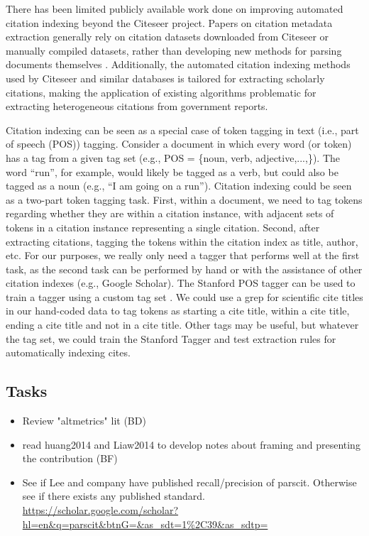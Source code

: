\documentclass[12pt]{article}
\begin{document}
There has been limited publicly available work done on improving automated citation indexing beyond the Citeseer project. Papers on citation metadata extraction generally rely on citation datasets downloaded from Citeseer or manually compiled datasets, rather than developing new methods for parsing documents themselves \cite{anzaroot2013}. Additionally, the automated citation indexing methods used by Citeseer and similar databases is tailored for extracting scholarly citations, making the application of existing algorithms problematic for extracting heterogeneous citations from government reports.

Citation indexing can be seen as a special case of token tagging in text (i.e., part of speech (POS)) tagging. Consider a document in which every word (or token) has a tag from a given tag set (e.g., POS = \{noun, verb, adjective,...,\}). The word ``run'', for example, would likely be tagged as a verb, but could also be tagged as a noun (e.g., ``I am going on a run''). Citation indexing could be seen as a two-part token tagging task. First, within a document, we need to tag tokens regarding whether they are within a citation instance, with adjacent sets of tokens in a citation instance representing a single citation. Second, after extracting citations, tagging the tokens within the citation index as title, author, etc. For our purposes, we really only need a tagger that performs well at the first task, as the second task can be performed by hand or with the assistance of other citation indexes (e.g., Google Scholar). The Stanford POS tagger can be used to train a tagger using a custom tag set \cite{toutanova2003}. We could use a grep for scientific cite titles in our hand-coded data to tag tokens as starting a cite title, within a cite title, ending a cite title and not in a cite title. Other tags may be useful, but whatever the tag set, we could train the Stanford Tagger and test extraction rules for automatically indexing cites.  


\subsection{Tasks}

\begin{itemize}
\item Review "altmetrics" lit (BD)
\item  read huang2014 and Liaw2014 to develop notes about framing and presenting the contribution (BF)
\item See if Lee and company have published recall/precision of parscit. Otherwise see if there exists any published standard. \url{https://scholar.google.com/scholar?hl=en&q=parscit&btnG=&as_sdt=1\%2C39&as_sdtp=}

\end{itemize}
\end{document}

